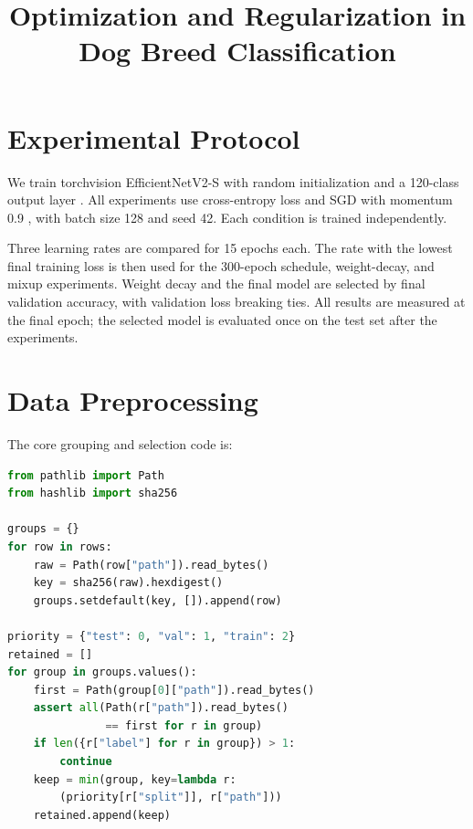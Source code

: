 \documentclass[letterpaper]{article}
\title{Optimization and Regularization in Dog Breed Classification}
\author{}
\begin{document}
\maketitle


\begin{abstract}

\end{abstract}

\section{Experimental Protocol}
We train torchvision EfficientNetV2-S with random initialization and a
120-class output layer \citep{tan2021efficientnetv2}. All experiments use
cross-entropy loss and SGD with momentum 0.9 \citep{goodfellow2016deep},
with batch size 128 and seed 42.
Each condition is trained independently.

Three learning rates are compared for 15 epochs each. The rate with the
lowest final training loss is then used for the 300-epoch schedule,
weight-decay, and mixup experiments. Weight decay and the final model are
selected by final validation accuracy, with validation loss breaking ties.
All results are measured at the final epoch; the selected model is evaluated
once on the test set after the experiments.

\section{Data Preprocessing}

\noindent\begin{minipage}{\columnwidth}
The core grouping and selection code is:
\begin{lstlisting}[language=Python]
from pathlib import Path
from hashlib import sha256

groups = {}
for row in rows:
    raw = Path(row["path"]).read_bytes()
    key = sha256(raw).hexdigest()
    groups.setdefault(key, []).append(row)

priority = {"test": 0, "val": 1, "train": 2}
retained = []
for group in groups.values():
    first = Path(group[0]["path"]).read_bytes()
    assert all(Path(r["path"]).read_bytes()
               == first for r in group)
    if len({r["label"] for r in group}) > 1:
        continue
    keep = min(group, key=lambda r:
        (priority[r["split"]], r["path"]))
    retained.append(keep)
\end{lstlisting}
\end{minipage}
\end{document}
